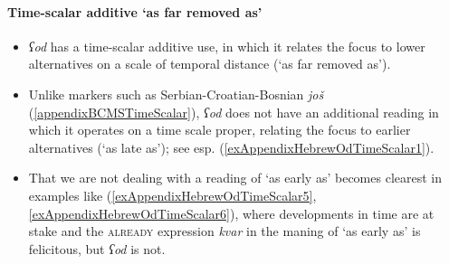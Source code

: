 \paragraph{Time-scalar additive \lq as far removed as\rq{}}\label{appendixHebrewOdTimeScalar}
\largerpage
\begin{itemize}
	\item \textit{ʕod} has a time-scalar additive use, in which it relates the focus to lower alternatives on a scale of temporal distance (\lq as far removed as\rq{}).
	\item Unlike markers such as Serbian-Croatian-Bosnian \textit{još} (\ref{appendixBCMSTimeScalar}), \textit{ʕod} does not have an additional reading in which it operates on a time scale proper, relating the focus to earlier alternatives (\lq as late as\rq{}); see esp. (\ref{exAppendixHebrewOdTimeScalar1}).
	\item That we are not dealing with a reading of \lq as early as\rq{ }becomes clearest in examples like (\ref{exAppendixHebrewOdTimeScalar5}, \ref{exAppendixHebrewOdTimeScalar6}), where developments in time are at stake and the \textsc{already} expression \textit{kvar} in the maning of \lq as early as\rq{ }is felicitous, but \textit{ʕod} is not.
\end{itemize}

